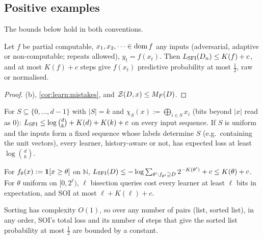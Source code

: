 \subsection{Positive examples}\label{sec:ex:positive}

The bounds below hold in both conventions.

\begin{proposition}\label{prop:ex:deterministic}
Let $f$ be partial computable, $x_1,x_2,\dots\in\operatorname{dom} f$ any inputs (adversarial, adaptive or non-computable; repeats allowed), $y_t=f(x_t)$. Then $L_{\mathrm{SFI}}(D_n)\le K(f)+c$, and at most $K(f)+c$ steps give $f(x_t)$ predictive probability at most $\frac12$, raw or normalised.
\end{proposition}

\begin{proof}
(b), \cref{cor:learn:mistakes}, and $\mathcal{Z}(D,x)\le M_{F}(D)$.
\end{proof}

\begin{example}\label{ex:ex:parity}
For $S\subseteq\{0,\dots,d-1\}$ with $|S|=k$ and $\chi_S(x):=\bigoplus_{i\in S}x_i$ (bits beyond $|x|$ read as $0$): $L_{\mathrm{SFI}}\le\log\binom dk+K(d)+K(k)+c$ on every input sequence. If $S$ is uniform and the inputs form a fixed sequence whose labels determine $S$ (e.g.\ containing the unit vectors), every learner, history-aware or not, has expected loss at least $\log\binom dk$.
\end{example}

\begin{example}[thresholds]\label{ex:ex:threshold}
For $f_\theta(x):=\mathbf{1}[x\ge\theta]$ on $\mathbb N$, $L_{\mathrm{SFI}}(D)\le-\log\sum_{\theta':f_{\theta'}\supseteq D}2^{-K(\theta')}+c\le K(\theta)+c$. For $\theta$ uniform on $[0,2^\ell)$, $\ell$ bisection queries cost every learner at least $\ell$ bits in expectation, and SOI at most $\ell+K(\ell)+c$.
\end{example}

\begin{example}[sorting]\label{ex:ex:sorting}
Sorting has complexity $O(1)$, so over any number of pairs (list, sorted list), in any order, SOI's total loss and its number of steps that give the sorted list probability at most $\frac12$ are bounded by a constant.
\end{example}

